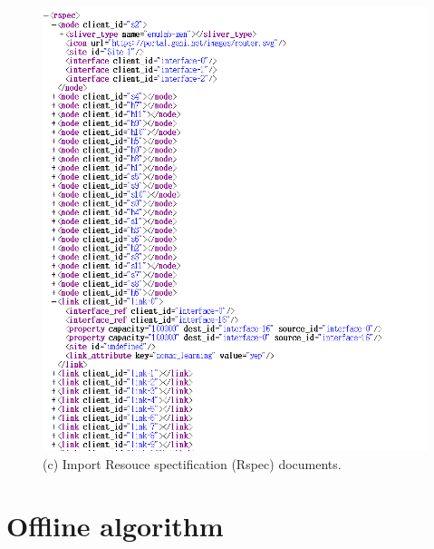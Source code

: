 \documentclass[a4paper,12pt]{report}
\begin{document}
\begin{large}
\begin{figure}
          \caption{(c) Import Resouce spectification (Rspec) documents.}
            \includegraphics[width=1.0\textwidth]{rspec_format.png}
      	\end{figure}
   \section{Offline algorithm}

\end{large}
\end{document}

